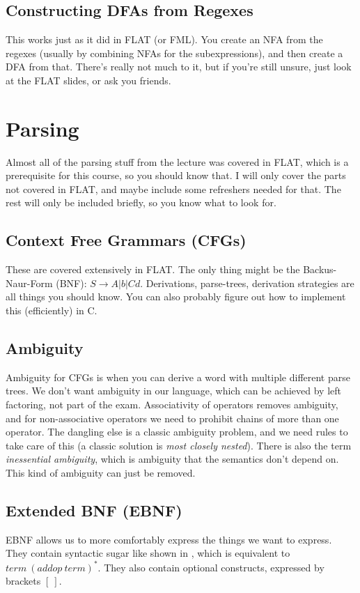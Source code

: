 \documentclass{article}
\begin{document}
\subsection{Constructing DFAs from Regexes}
This works just as it did in FLAT (or FML).
You create an NFA from the regexes (usually by combining NFAs for the subexpressions), and then create a DFA from that.
There's really not much to it, but if you're still unsure, just look at the FLAT slides, or ask you friends.


\section{Parsing}
Almost all of the parsing stuff from the lecture was covered in FLAT, which is a prerequisite for this course, so you should know that.
I will only cover the parts not covered in FLAT, and maybe include some refreshers needed for that.
The rest will only be included briefly, so you know what to look for.

\subsection{Context Free Grammars (CFGs)}
These are covered extensively in FLAT.
The only thing might be the Backus-Naur-Form (BNF): $S \rightarrow A | b | Cd$.
Derivations, parse-trees, derivation strategies are all things you should know.
You can also probably figure out how to implement this (efficiently) in C.

\subsection{Ambiguity}
Ambiguity for CFGs is when you can derive a word with multiple different parse trees.
We don't want ambiguity in our language, which can be achieved by left factoring, not part of the exam.
Associativity of operators removes ambiguity, and for non-associative operators we need to prohibit chains of more than one operator.
The dangling else is a classic ambiguity problem, and we need rules to take care of this (a classic solution is \emph{most closely nested}).
There is also the term \emph{inessential ambiguity}, which is ambiguity that the semantics don't depend on.
This kind of ambiguity can just be removed.

\subsection{Extended BNF (EBNF)}
EBNF allows us to more comfortably express the things we want to express.
They contain syntactic sugar like shown in , which is equivalent to $term\ (addop\ term)^*$.
They also contain optional constructs, expressed by brackets $\left[\ \right]$.
\end{document}
